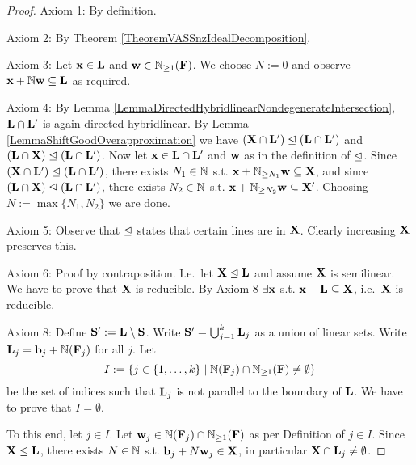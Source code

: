 \begin{proof}
Axiom 1: By definition.

Axiom 2: By Theorem \ref{TheoremVASSnzIdealDecomposition}.

Axiom 3: Let \(\mathbf{x} \in \mathbf{L}\) and \(\mathbf{w} \in \mathbb{N}_{\geq 1}(\mathbf{F})\). We choose \(N:=0\) and observe \(\mathbf{x}+\mathbb{N} \mathbf{w} \subseteq \mathbf{L}\) as required.

Axiom 4: By Lemma \ref{LemmaDirectedHybridlinearNondegenerateIntersection}, \(\mathbf{L} \cap \mathbf{L}'\) is again directed hybridlinear. By Lemma \ref{LemmaShiftGoodOverapproximation} we have \((\mathbf{X} \cap \mathbf{L}') \trianglelefteq (\mathbf{L} \cap \mathbf{L}')\) and \((\mathbf{L} \cap \mathbf{X}) \trianglelefteq (\mathbf{L} \cap \mathbf{L}')\). Now let \(\mathbf{x} \in \mathbf{L} \cap \mathbf{L}'\) and \(\mathbf{w}\) as in the definition of \(\trianglelefteq\). Since \((\mathbf{X} \cap \mathbf{L}') \trianglelefteq (\mathbf{L} \cap \mathbf{L}')\), there exists \(N_1 \in \mathbb{N}\) s.t. \(\mathbf{x}+\mathbb{N}_{\geq N_1} \mathbf{w} \subseteq \mathbf{X}\), and since \((\mathbf{L} \cap \mathbf{X}) \trianglelefteq (\mathbf{L} \cap \mathbf{L}')\), there exists \(N_2 \in \mathbb{N}\) s.t. \(\mathbf{x}+\mathbb{N}_{\geq N_2} \mathbf{w} \subseteq \mathbf{X}'\). Choosing \(N:=\max \{N_1, N_2\}\) we are done.

Axiom 5: Observe that \(\trianglelefteq\) states that certain lines are in \(\mathbf{X}\). Clearly increasing \(\mathbf{X}\) preserves this.

Axiom 6: Proof by contraposition. I.e.\ let \(\mathbf{X} \trianglelefteq \mathbf{L}\) and assume \(\mathbf{X}\) is semilinear. We have to prove that \(\mathbf{X}\) is reducible. By Axiom 8 \(\exists \mathbf{x}\) s.t. \(\mathbf{x}+\mathbf{L} \subseteq \mathbf{X}\), i.e.\ \(\mathbf{X}\) is reducible.

Axiom 8: Define \(\mathbf{S}':=\mathbf{L} \setminus \mathbf{S}\). Write \(\mathbf{S}'=\bigcup_{j=1}^k \mathbf{L}_j\) as a union of linear sets. Write \(\mathbf{L}_j=\mathbf{b}_j+\mathbb{N}(\mathbf{F}_j)\) for all \(j\). Let \[I:=\{j \in \{1,\dots, k\} \mid \mathbb{N}(\mathbf{F}_j) \cap \mathbb{N}_{\geq 1}(\mathbf{F}) \neq \emptyset\}\] be the set of indices such that \(\mathbf{L}_j\) is not parallel to the boundary of \(\mathbf{L}\). We have to prove that \(I=\emptyset\). 

To this end, let \(j \in I\). Let \(\mathbf{w}_j \in \mathbb{N}(\mathbf{F}_j) \cap \mathbb{N}_{\geq 1}(\mathbf{F})\) as per Definition of \(j \in I\). Since \(\mathbf{X} \trianglelefteq \mathbf{L}\), there exists \(N \in \mathbb{N}\) s.t. \(\mathbf{b}_j+N \mathbf{w}_j \in \mathbf{X}\), in particular \(\mathbf{X} \cap \mathbf{L}_j \neq \emptyset\). 


\end{proof}
